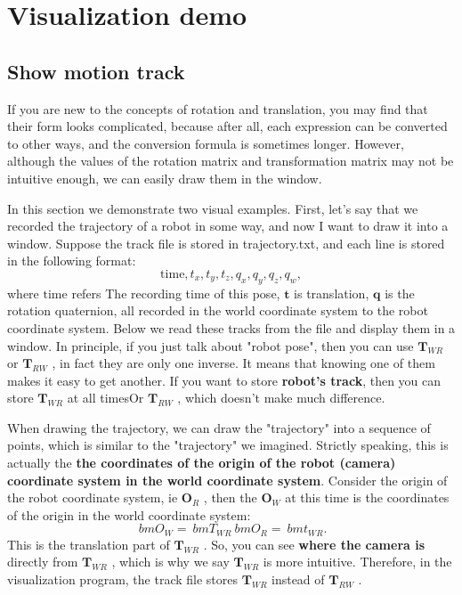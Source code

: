 \section{Visualization demo}

\subsection{Show motion track}

If you are new to the concepts of rotation and translation, you may find that their form looks complicated, because after all, each expression can be converted to other ways, and the conversion formula is sometimes longer. However, although the values of the rotation matrix and transformation matrix may not be intuitive enough, we can easily draw them in the window.

In this section we demonstrate two visual examples. First, let's say that we recorded the trajectory of a robot in some way, and now I want to draw it into a window. Suppose the track file is stored in trajectory.txt, and each line is stored in the following format: $$ \mathrm {time}, t_x, t_y, t_z, q_x, q_y, q_z, q_w, $$ where $ \mathrm {time} $ refers The recording time of this pose, $ \bm {t} $ is translation, $ \bm {q} $ is the rotation quaternion, all recorded in the world coordinate system to the robot coordinate system. Below we read these tracks from the file and display them in a window. In principle, if you just talk about "robot pose", then you can use $ \bm {T}_{WR} $ or $ \bm {T}_{RW} $ , in fact they are only one inverse. It means that knowing one of them makes it easy to get another. If you want to store \textbf {robot's track}, then you can store $ \bm {T}_{WR} $ at all timesOr $ \bm {T}_{RW} $ , which doesn't make much difference.

When drawing the trajectory, we can draw the "trajectory" into a sequence of points, which is similar to the "trajectory" we imagined. Strictly speaking, this is actually the \textbf {the coordinates of the origin of the robot (camera) coordinate system in the world coordinate system}. Consider the origin of the robot coordinate system, ie $ \bm {O}_{R} $ , then the $ \bm {O}_{W} $ at this time is the coordinates of the origin in the world coordinate system:
\begin{equation}
\ bm {O} _ {W} = \ bm {T} _ {WR} \ bm {O} _R = \ bm {t} _ {WR}.
\end{equation}
This is the translation part of $ \bm {T}_{WR} $ . So, you can see \textbf {where the camera is} directly from $ \bm {T}_{WR} $ , which is why we say $ \bm {T}_{WR} $ is more intuitive. Therefore, in the visualization program, the track file stores $ \bm {T}_{WR} $ instead of $ \bm {T}_{RW} $ .

